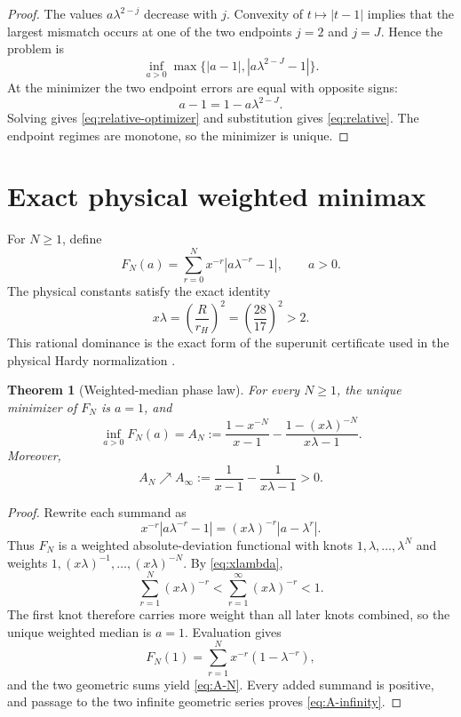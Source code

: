 \documentclass[11pt]{article}
\newtheorem{theorem}{Theorem}[section]
\theoremstyle{remark}
\begin{document}
\begin{proof}
The values $a\lambda^{2-j}$ decrease with $j$.  Convexity of
$t\mapsto|t-1|$ implies that the largest mismatch occurs at one of the two
endpoints $j=2$ and $j=J$.  Hence the problem is
\[
 \inf_{a>0}\max\{|a-1|,|a\lambda^{2-J}-1|\}.
\]
At the minimizer the two endpoint errors are equal with opposite signs:
\[
 a-1=1-a\lambda^{2-J}.
\]
Solving gives \eqref{eq:relative-optimizer} and substitution gives
\eqref{eq:relative}.  The endpoint regimes are monotone, so the minimizer
is unique.
\end{proof}

\section{Exact physical weighted minimax}

For $N\ge1$, define
\begin{equation}\label{eq:F-N}
 F_N(a)=\sum_{r=0}^{N}x^{-r}|a\lambda^{-r}-1|,
 \qquad a>0.
\end{equation}
The physical constants satisfy the exact identity
\begin{equation}\label{eq:xlambda}
 x\lambda=\left(\frac{R}{r_H}\right)^2
 =\left(\frac{28}{17}\right)^2>2.
\end{equation}
This rational dominance is the exact form of the superunit certificate used
in the physical Hardy normalization \citep{WangProjectorMass2026}.

\begin{theorem}[Weighted-median phase law]
\label{thm:weighted}
For every $N\ge1$, the unique minimizer of $F_N$ is $a=1$, and
\begin{equation}\label{eq:A-N}
 \boxed{
 \inf_{a>0}F_N(a)=A_N
 :=\frac{1-x^{-N}}{x-1}
   -\frac{1-(x\lambda)^{-N}}{x\lambda-1}.}
\end{equation}
Moreover,
\begin{equation}\label{eq:A-infinity}
 A_N\nearrow A_\infty
 :=\frac1{x-1}-\frac1{x\lambda-1}>0.
\end{equation}
\end{theorem}

\begin{proof}
Rewrite each summand as
\[
 x^{-r}|a\lambda^{-r}-1|
 =(x\lambda)^{-r}|a-\lambda^r|.
\]
Thus $F_N$ is a weighted absolute-deviation functional with knots
$1,\lambda,\ldots,\lambda^N$ and weights
$1,(x\lambda)^{-1},\ldots,(x\lambda)^{-N}$.  By
\eqref{eq:xlambda},
\[
 \sum_{r=1}^{N}(x\lambda)^{-r}
 <\sum_{r=1}^{\infty}(x\lambda)^{-r}<1.
\]
The first knot therefore carries more weight than all later knots combined,
so the unique weighted median is $a=1$.  Evaluation gives
\[
 F_N(1)=\sum_{r=1}^{N}x^{-r}(1-\lambda^{-r}),
\]
and the two geometric sums yield \eqref{eq:A-N}.  Every added summand is
positive, and passage to the two infinite geometric series proves
\eqref{eq:A-infinity}.
\end{proof}
\end{document}
